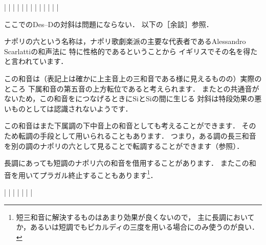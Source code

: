 \documentclass[dvipdfmx,uplatex,b5paper,openany,jbase=12Q,nomag*,textwidth-limit=44%
               ]{gachimuchi}
\begin{document}
\begin{Music}
  \generalmeter{\meterC}%
  \Startpiece
  \NOTes%
  |\en%
  \NOTes%
  |\en%
  \bar%
  \NOTEs%
  |%
  \en\doublebar%
  \NOTes%
  |%
  \en\bar%
  \NOTes%
  |%
  \en\bar%
  \NOTEs%
  |%
  \en\doublebar%
  \NOTes%
  |\en%
  \NOTes%
  |\en%
  \bar%
  \NOTEs%
  |%
  \en\setdoublebar%
  \endpiece%
\end{Music}
\begin{NB}
ここでのDes--Dの対斜は問題にならない．
以下の［余談］参照．
\end{NB}

\begin{Yodan}
ナポリの六という名称は，ナポリ歌劇楽派の主要な代表者であるAlessandro Scarlattiの和声法に
特に性格的であるということから
イギリスでその名を得たと言われています\cite[p.211]{chTHUILLE1}．

この和音は（表記上は確かに上主音上の三和音である様に見えるものの）実際のところ
下属和音の第五音の上方転位であると考えられます\cite[p.211]{chTHUILLE1}．
また\Gnv との共通音がないため，この和音を\Gnv につなげるときにSi\aFlat とSi\aNatural の間に生じる
対斜は特段効果の悪いものとしては認識されないようです．

この和音はまた下属調の下中音上の和音としても考えることができます．
そのため転調の手段として用いられることもあります．
つまり，ある調の長三和音を別の調のナポリの六として見ることで転調することができます（参照）．
\end{Yodan}

長調にあっても短調のナポリ六の和音を借用することがあります．
またこの和音を用いてプラガル終止することもあります\footnote{%
  短三和音に解決するものはあまり効果が良くないので，
  主に長調においてか，あるいは短調でもピカルディの三度を用いる場合にのみ使うのが良い．
}．
\begin{Music}[0.6\linewidth]
  \generalmeter{\meterC}
  \Startpiece
  \NOTes%
  |\en%
  \NOTes%
  |\en%
  \bar%
  \NOTEs%
  |%
  \en\doublebar%
  \NOTes%
  |%
  \en\bar%
  \NOTEs%
  |%
  \en\setdoublebar%
  \endpiece%
\end{Music}
\end{document}
